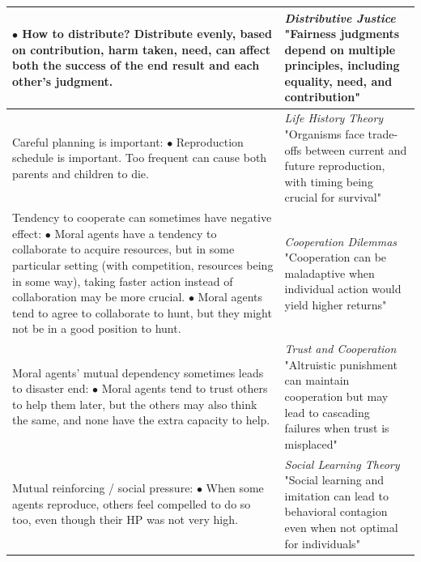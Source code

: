 \begin{table}[ht]
\begin{tabular}{p{8.5cm}p{8.5cm}}
{\hspace*{1em} $\bullet$ How to distribute? Distribute evenly, based on contribution, harm taken, need, can affect both the success of the end result and each other's judgment.} & 
\parbox[t]{8.5cm}{\textit{Distributive Justice} \citep{konow2003which} \\
"Fairness judgments depend on multiple principles, including equality, need, and contribution"} \\
\hline
\parbox[t]{8.5cm}{Careful planning is important: \\
\hspace*{1em} $\bullet$ Reproduction schedule is important. Too frequent can cause both parents and children to die.} & 
\parbox[t]{8.5cm}{\textit{Life History Theory} \citep{kaplan1992evolution} \\
"Organisms face trade-offs between current and future reproduction, with timing being crucial for survival"} \\
\hline
\parbox[t]{8.5cm}{Tendency to cooperate can sometimes have negative effect: \\ 
\hspace*{1em} $\bullet$ Moral agents have a tendency to collaborate to acquire resources, but in some particular setting (with competition, resources being in some way), taking faster action instead of collaboration may be more crucial. \\
\hspace*{1em} $\bullet$ Moral agents tend to agree to collaborate to hunt, but they might not be in a good position to hunt.} & 
\parbox[t]{8.5cm}{\textit{Cooperation Dilemmas} \citep{bowles2004evolution} \\
"Cooperation can be maladaptive when individual action would yield higher returns"} \\
\hline
\parbox[t]{8.5cm}{Moral agents' mutual dependency sometimes leads to disaster end: \\
\hspace*{1em} $\bullet$ Moral agents tend to trust others to help them later, but the others may also think the same, and none have the extra capacity to help.} & 
\parbox[t]{8.5cm}{\textit{Trust and Cooperation} \citep{fehr2002altruistic} \\
"Altruistic punishment can maintain cooperation but may lead to cascading failures when trust is misplaced"} \\
\hline
\parbox[t]{8.5cm}{Mutual reinforcing / social pressure: \\
\hspace*{1em} $\bullet$ When some agents reproduce, others feel compelled to do so too, even though their HP was not very high.} & 
\parbox[t]{8.5cm}{\textit{Social Learning Theory} \citep{bandura1977social} \\
"Social learning and imitation can lead to behavioral contagion even when not optimal for individuals"} \\
\hline
\end{tabular}
\end{table}


